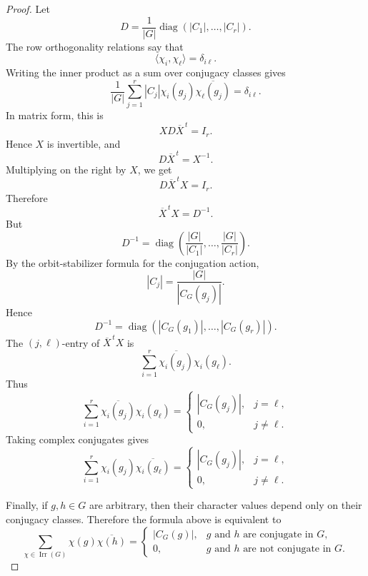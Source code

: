 \begin{proof}
    Let
    \[
        D
        =
        \frac{1}{|G|}
        \operatorname{diag}(|C_1|,\dots,|C_r|).
    \]
    The row orthogonality relations say that
    \[
        \langle \chi_i,\chi_\ell\rangle
        =
        \delta_{i\ell}.
    \]
    Writing the inner product as a sum over conjugacy classes gives
    \[
        \frac{1}{|G|}
        \sum_{j=1}^r
        |C_j|\chi_i(g_j)\overline{\chi_\ell(g_j)}
        =
        \delta_{i\ell}.
    \]
    In matrix form, this is
    \[
        X D \overline{X}^{\,t}=I_r.
    \]
    Hence \(X\) is invertible, and
    \[
        D\overline{X}^{\,t}=X^{-1}.
    \]
    Multiplying on the right by \(X\), we get
    \[
        D\overline{X}^{\,t}X=I_r.
    \]
    Therefore
    \[
        \overline{X}^{\,t}X
        =
        D^{-1}.
    \]
    But
    \[
        D^{-1}
        =
        \operatorname{diag}\left(
        \frac{|G|}{|C_1|},
        \dots,
        \frac{|G|}{|C_r|}
        \right).
    \]
    By the orbit-stabilizer formula for the conjugation action,
    \[
        |C_j|
        =
        \frac{|G|}{|C_G(g_j)|}.
    \]
    Hence
    \[
        D^{-1}
        =
        \operatorname{diag}\left(
        |C_G(g_1)|,
        \dots,
        |C_G(g_r)|
        \right).
    \]
    The \((j,\ell)\)-entry of \(\overline{X}^{\,t}X\) is
    \[
        \sum_{i=1}^r
        \overline{\chi_i(g_j)}\chi_i(g_\ell).
    \]
    Thus
    \[
        \sum_{i=1}^r
        \overline{\chi_i(g_j)}\chi_i(g_\ell)
        =
        \begin{cases}
            |C_G(g_j)|, & j=\ell,     \\
            0,          & j\neq \ell.
        \end{cases}
    \]
    Taking complex conjugates gives
    \[
        \sum_{i=1}^r
        \chi_i(g_j)\overline{\chi_i(g_\ell)}
        =
        \begin{cases}
            |C_G(g_j)|, & j=\ell,     \\
            0,          & j\neq \ell.
        \end{cases}
    \]

    Finally, if \(g,h\in G\) are arbitrary, then their character values depend only
    on their conjugacy classes. Therefore the formula above is equivalent to
    \[
        \sum_{\chi\in \operatorname{Irr}(G)}
        \chi(g)\overline{\chi(h)}
        =
        \begin{cases}
            |C_G(g)|, & g \text{ and } h \text{ are conjugate in }G,     \\
            0,        & g \text{ and } h \text{ are not conjugate in }G.
        \end{cases}
    \]
\end{proof}
